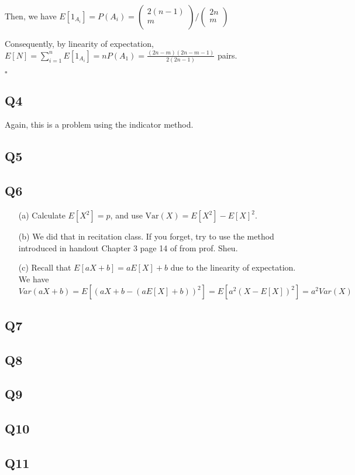 \documentclass[12pt]{article}
\begin{document}
Then, we have  \(E[1_{A_i}] = P(A_i) = \begin{pmatrix}
     2(n-1) \\
     m \\
\end{pmatrix} / \begin{pmatrix}
     2n \\
     m \\
\end{pmatrix}\)

Consequently, by linearity of expectation,\\
\(E[N] = \sum_{i=1}^{n}E[1_{A_i}] = nP(A_1) = \frac{(2n-m)(2n-m-1)}{2(2n-1)}\) pairs.    

\hspace{\textwidth}\(\square\) 
\subsection*{Q4}
Again, this is a problem using the indicator method. 

\subsection*{Q5}
\subsection*{Q6}
\begin{itemize}
    \item[(a)] Calculate \(E[X^2] = p\), and use \(\text{Var}(X) = E[X^2] - E[X]^2\).   
    \item[(b)] We did that in recitation class. If you forget, try to use the method introduced in handout Chapter 3 page 14 of from prof. Sheu.  
    \item[(c)] Recall that \(E[aX +b] = aE[X] + b\) due to the linearity of expectation. We have \(Var(aX+b) = E[(aX+b - (aE[X]+b))^2] = E[a^2(X-E[X])^2] = a^2 Var(X) \) 
\end{itemize}
\subsection*{Q7}
\subsection*{Q8}
\subsection*{Q9}
\subsection*{Q10}
\subsection*{Q11}
\end{document}
